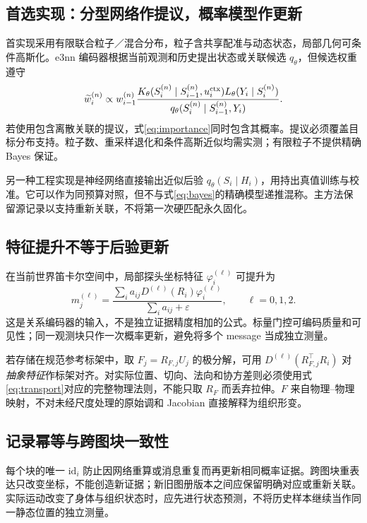 \documentclass[UTF8,fontset=fandol,11pt,a4paper]{ctexart}
\theoremstyle{plain}
\theoremstyle{definition}
\theoremstyle{remark}
\numberwithin{equation}{section}
\begin{document}
\subsection{首选实现：分型网络作提议，概率模型作更新}
首实现采用有限联合粒子／混合分布，粒子含共享配准与动态状态，局部几何可条件高斯化。e3nn 编码器根据当前观测和历史提出状态或关联候选 $q_\theta$，但候选权重遵守
\begin{equation}
 \widetilde w_i^{(n)}\propto
 w_{i-1}^{(n)}
 \frac{K_\theta(S_i^{(n)}\mid S_{i-1}^{(n)},u_i^{\rm ctx})
 L_\theta(Y_i\mid S_i^{(n)})}{q_\theta(S_i^{(n)}\mid S_{i-1}^{(n)},Y_i)}.
 \label{eq:importance}
\end{equation}
若使用包含离散关联的提议，式\eqref{eq:importance}同时包含其概率。提议必须覆盖目标分布支持。粒子数、重采样退化和条件高斯近似均需实测；有限粒子不提供精确 Bayes 保证。

另一种工程实现是神经网络直接输出近似后验 $q_\theta(S_i\mid H_i)$，用持出真值训练与校准。它可以作为同预算对照，但不与式\eqref{eq:bayes}的精确模型递推混称。主方法保留源记录以支持重新关联，不将第一次硬匹配永久固化。

\subsection{特征提升不等于后验更新}
在当前世界笛卡尔空间中，局部探头坐标特征 $\varphi_i^{(\ell)}$ 可提升为
\begin{equation}
 m_j^{(\ell)}=
 \frac{\sum_i a_{ij}D^{(\ell)}(R_i)\varphi_i^{(\ell)}}{\sum_i a_{ij}+\varepsilon},\qquad \ell=0,1,2.
 \label{eq:typedlift}
\end{equation}
这是关系编码器的输入，不是独立证据精度相加的公式。标量门控可编码质量和可见性；同一观测块只作一次概率更新，避免将多个 message 当成独立测量。

若存储在规范参考标架中，取 $F_j=R_{F,j}U_j$ 的极分解，可用 $D^{(\ell)}(R_{F,j}^\top R_i)$ 对\emph{抽象特征}作标架对齐。对实际位置、切向、法向和协方差则必须使用式\eqref{eq:transport}对应的完整物理法则，不能只取 $R_F$ 而丢弃拉伸。$F$ 来自物理--物理映射，不对未经尺度处理的原始调和 Jacobian 直接解释为组织形变。

\subsection{记录幂等与跨图块一致性}
每个块的唯一 $\mathrm{id}_i$ 防止因网络重算或消息重复而再更新相同概率证据。跨图块重表达只改变坐标，不能创造新证据；新旧图册版本之间应保留明确对应或重新关联。实际运动改变了身体与组织状态时，应先进行状态预测，不将历史样本继续当作同一静态位置的独立测量。
\end{document}
